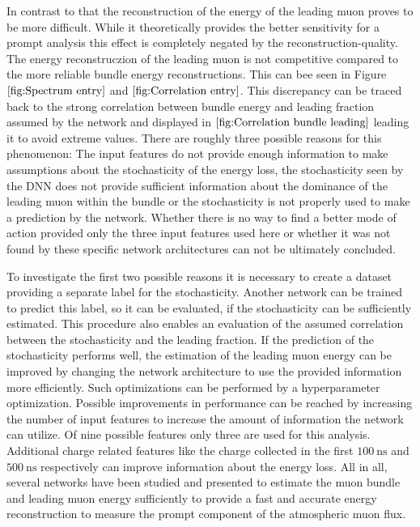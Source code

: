 \documentclass[
  tucolor,       %
  BCOR=12mm,     %
  parskip=half,  %
  open=any,      %
  cleardoublepage=plain,  %
]{tudothesis}
\begin{document}
In contrast to that the reconstruction of the energy of the leading muon proves to be more difficult. 
While it theoretically provides the better sensitivity for a prompt analysis this effect is completely negated by the reconstruction-quality. The energy reconstruczion of the leading muon is not competitive compared to the more reliable bundle energy reconstructions. This can bee seen in Figure $\ref{fig:Spectrum entry}$ and $\ref{fig:Correlation entry}$.
This discrepancy can be traced back to the strong correlation between bundle energy and leading fraction assumed by the network and displayed in $\ref{fig:Correlation bundle leading}$ leading it to avoid extreme values.
There are roughly three possible reasons for this phenomenon: The input features do not provide enough information to make assumptions about the stochasticity of the energy loss, the stochasticity seen by the DNN does not provide sufficient information about the dominance of the leading muon within the bundle or the stochasticity is not properly used to make a prediction by the network.
Whether there is no way to find a better mode of action provided only the three input features used here or whether it was not found by these specific network architectures can not be ultimately concluded.

To investigate the first two possible reasons it is necessary to create a dataset providing a separate label for the stochasticity.
Another network can be trained to predict this label, so it can be evaluated, if the stochasticity can be sufficiently estimated.
This procedure also enables an evaluation of the assumed correlation between the stochasticity and the leading fraction.
If the prediction of the stochasticity performs well, the estimation of the leading muon energy can be improved by changing the network architecture to use the provided information more efficiently.
Such optimizations can be performed by a hyperparameter optimization.
Possible improvements in performance can be reached by increasing the number of input features to increase the amount of information the network can utilize. Of nine possible features only three are used for this analysis. Additional charge related features like the charge collected in the first $\SI{100}{\nano\second}$ and $\SI{500}{\nano\second}$ respectively can improve information about the energy loss.
All in all, several networks have been studied and presented to estimate the muon bundle and leading muon energy sufficiently to provide a fast and accurate energy reconstruction to measure the prompt component of the atmospheric muon flux.
\appendix
\end{document}

